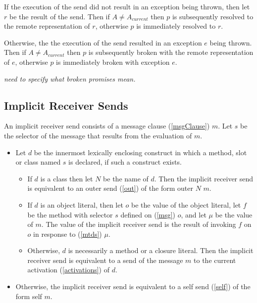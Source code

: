 \documentclass{article}
\newcommand{\code}[1]{{\sf #1}}
\begin{document}
If the execution of the send did not result in an exception being thrown, then let $r$ be the result of the send.   Then if $A \ne A_{current}$  then $p$ is subsequently resolved to the remote representation of $r$, otherwise $p$ is immediately resolved to $r$.

Otherwise, the the execution of the send resulted in an exception $e$ being thrown. Then if $A \ne A_{current}$  then $p$ is subsequently broken with the remote representation of $e$, otherwise $p$ is immediately broken with exception $e$.

{\it need to specify what broken promises mean. 
}

\subsection{Implicit Receiver Sends}
\label{here}

An implicit receiver send consists of a message clause (\ref{msgClause}) $m$.  
Let $s$ be the selector of the message that results from the evaluation of $m$.
\begin{itemize}
\item
Let $d$ be the innermost lexically enclosing construct in which a method, slot or class named $s$ is declared, if such a construct exists. 
  \begin{itemize}
    \item  If $d$ is a class then let $N$ be the name of $d$. Then the implicit receiver send is equivalent to an outer send (\ref{out}) of the form \code{outer $N$ $m$}.
    \item If $d$ is an object literal, then let  $o$ be the value of the object literal, let $f$ be the method with selector $s$ defined on (\ref{msg}) $o$, and let $\mu$ be the value of $m$. The value of the implicit receiver send is the result of invoking $f$  on $o$ in response to (\ref{mtds})  $\mu$.
  \item Otherwise, $d$ is necessarily a method or a closure literal. Then the implicit receiver send is equivalent to a send of the message $m$ to the current activation (\ref{activations}) of $d$.
 \end{itemize}
\item
Otherwise, the implicit receiver send is equivalent to a self send (\ref{self}) of the form \code{self $m$}.
\end{itemize}
\end{document}
